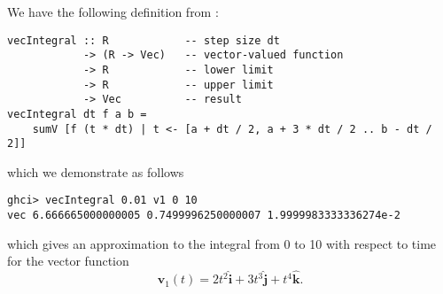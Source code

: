 
We have the following definition from :
\scriptsize\begin{verbatim}
vecIntegral :: R            -- step size dt
            -> (R -> Vec)   -- vector-valued function
            -> R            -- lower limit
            -> R            -- upper limit
            -> Vec          -- result
vecIntegral dt f a b =  
    sumV [f (t * dt) | t <- [a + dt / 2, a + 3 * dt / 2 .. b - dt / 2]]
\end{verbatim}\normalsize
which we demonstrate as follows
\scriptsize\begin{verbatim}
ghci> vecIntegral 0.01 v1 0 10
vec 6.666665000000005 0.7499996250000007 1.9999983333336274e-2
\end{verbatim}\normalsize
which gives an approximation to the integral from 0 to 10 with respect
to time for the vector function
\[
    \mathbf{v}_1(t) = 2t^2\hat{\mathbf{i}} + 3t^3\hat{\mathbf{j}}
    + t^4 \hat{\mathbf{k}}.
\]
